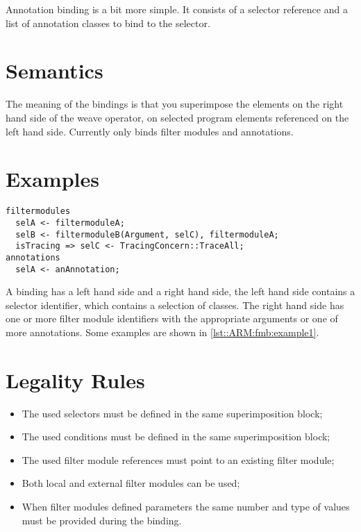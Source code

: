Annotation binding is a bit more simple.
It consists of a selector reference and a list of annotation classes to bind to the selector.

\section{Semantics}
The meaning of the bindings is that you superimpose the elements on the right hand side of the weave operator, on selected program elements referenced on the left hand side.
Currently \Compose* only binds filter modules and annotations. 

\section{Examples}
\begin{lstlisting}[caption={Examples of bindings}, label = lst::ARM:fmb:example1,
style=listing, language =ComposeStar, float = tpb]
filtermodules
  selA <- filtermoduleA;
  selB <- filtermoduleB(Argument, selC), filtermoduleA;
  isTracing => selC <- TracingConcern::TraceAll;
annotations
  selA <- anAnnotation;
\end{lstlisting}
A binding has a left hand side and a right hand side, the left hand side contains a selector identifier, which contains a selection of classes. 
The right hand side has one or more filter module identifiers with the appropriate arguments or one of more annotations. 
Some examples are shown in \autoref{lst::ARM:fmb:example1}.

\section{Legality Rules}
\begin{itemize}[noitemsep]
\item The used selectors must be defined in the same superimposition block;
\item The used conditions must be defined in the same superimposition block;
\item The used filter module references must point to an existing filter module;
\item Both local and external filter modules can be used;
\item When filter modules defined parameters the same number and type of values must be provided during the binding.
\end{itemize}


